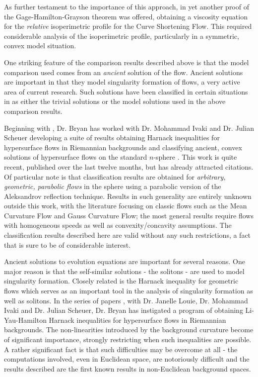 \documentclass[12pt]{article}
\begin{document}
As further testament to the importance of this approach, in \cite{MR2843240} yet another proof of the Gage-Hamilton-Grayson theorem was offered, obtaining a viscosity equation for the \emph{relative} isoperimetric profile for the Curve Shortening Flow. This required considerable analysis of the isoperimetric profile, particularly in a symmetric, convex model situation.

One striking feature of the comparison results described above is that the model comparison used comes from an \emph{ancient} solution of the flow. Ancient solutions are important in that they model singularity formation of flows, a very active area of current research. Such solutions have been classified in certain situations in as either the trivial solutions or the model solutions used in the above comparison results.

Beginning with \cite{bryanlouie}, Dr. Bryan has worked with Dr. Mohammad Ivaki and Dr. Julian Scheuer developing a suite of results obtaining Harnack inequalities for hypersurface flows in Riemannian backgrounds and classifying ancient, convex solutions of hypersurface flows on the standard $n$-sphere \cite{BIS4,2016arXiv160401694B,2016arXiv160401694B,2015arXiv150802821B}. This work is quite recent, published over the last twelve months, but has already attracted citations. Of particular note is that classification results are obtained for \emph{arbitrary, geometric, parabolic flows} in the sphere using a parabolic version of the Aleksandrov reflection technique. Results in such generality are entirely unknown outside this work, with the literature focusing on classic flows such as the Mean Curvature Flow and Gauss Curvature Flow; the most general results require flows with homogeneous speeds as well as convexity/concavity assumptions. The classification results described here are valid without any such restrictions, a fact that is sure to be of considerable interest.

Ancient solutions to evolution equations are important for several reasons. One major reason is that the self-similar solutions - the solitons - are used to model singularity formation. Closely related is the Harnack inequality for geometric flows which serves as an important tool in the analysis of singularity formation as well as solitons. In the series of papers \cite{bryanlouie,2016arXiv160401694B,2015arXiv150802821B,2015arXiv151203374B}, with Dr. Janelle Louie, Dr. Mohammad Ivaki and Dr. Julian Scheuer, Dr. Bryan has instigated a program of obtaining Li-Yau-Hamilton Harnack inequalities for hypersurface flows in Riemannian backgrounds. The non-linearities introduced by the background curvature become of significant importance, strongly restricting when such inequalities are possible. A rather significant fact is that such difficulties may be overcome at all - the computations involved, even in Euclidean space, are notoriously difficult and the results described are the first known results in non-Euclidean background spaces.
\end{document}
